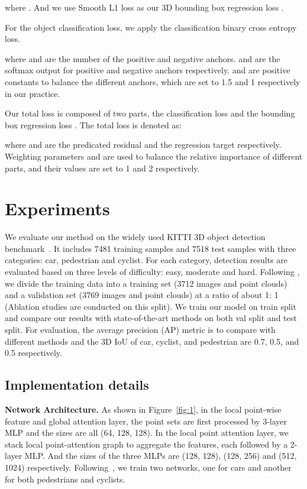 \documentclass{article}
\begin{document}
where . And we use Smooth L1 loss\cite{7410526} as our 3D bounding box regression loss .

For the object classification loss, we apply the classification binary cross entropy loss.

where  and  are the number of the positive and negative anchors.  and  are the softmax output for positive and negative anchors respectively.  and  are positive constants to balance the different anchors, which are set to 1.5 and 1 respectively in our practice.

Our total loss is composed of two parts, the classification loss  and the bounding box regression loss . The total loss is denoted as:

where  and  are the predicated residual and the regression target respectively. Weighting parameters  and  are used to balance the relative importance of different parts, and their values are set to 1 and 2 respectively.
\section{Experiments}
We evaluate our method on the widely used KITTI 3D object detection benchmark~\cite{geiger2012we}. It includes 7481 training samples and 7518 test samples with three categories: car, pedestrian and cyclist. For each category, detection results are evaluated based on three levels of difficulty: easy, moderate and hard. Following \cite{chen20173d}, we divide the training data into a training set (3712 images and point clouds) and a validation set (3769 images and point clouds) at a ratio of about 1: 1 (Ablation studies are conducted on this split). We train our model on train split and compare our results with state-of-the-art methods on both val split and test split. For evaluation, the average precision (AP) metric is to compare with different methods and the 3D IoU of car, cyclist, and pedestrian are 0.7, 0.5, and 0.5 respectively.
\subsection{Implementation details}
\textbf{Network Architecture.} As shown in Figure~\ref{fig:1}, in the local point-wise feature and global attention layer, the point sets are first processed by 3-layer MLP and the sizes are all (64, 128, 128). In the local point attention layer, we stack  local point-attention graph to aggregate the features, each followed by a 2-layer MLP. And the sizes of the three MLPs are (128, 128), (128, 256) and (512, 1024) respectively. Following~\cite{ku2018joint,zhou2018voxelnet,yang2019std}, we train two networks, one for cars and another for both pedestrians and cyclists.
\end{document}

